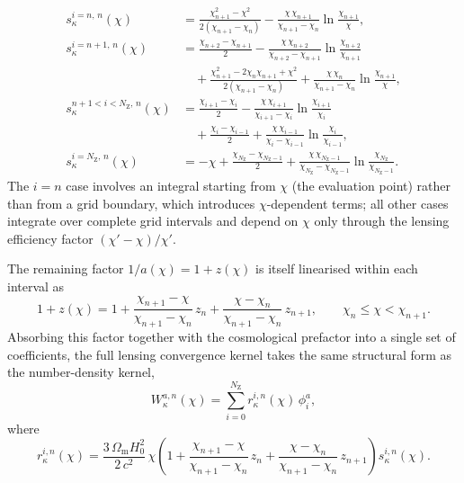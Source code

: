 \begin{align}
    s_\kappa^{i=n,\,n}(\chi) &= \frac{\chi_{n+1}^2 - \chi^2}{2(\chi_{n+1} - \chi_n)} - \frac{\chi\,\chi_{n+1}}{\chi_{n+1} - \chi_n}\ln\frac{\chi_{n+1}}{\chi}, \label{eq:4.9a} \\[6pt]
    s_\kappa^{i=n+1,\,n}(\chi) &= \frac{\chi_{n+2} - \chi_{n+1}}{2} - \frac{\chi\,\chi_{n+2}}{\chi_{n+2} - \chi_{n+1}}\ln\frac{\chi_{n+2}}{\chi_{n+1}} \nonumber\\
    &\quad + \frac{\chi_{n+1}^2 - 2\chi_n\chi_{n+1} + \chi^2}{2(\chi_{n+1} - \chi_n)} + \frac{\chi\,\chi_n}{\chi_{n+1} - \chi_n}\ln\frac{\chi_{n+1}}{\chi}, \label{eq:4.9b} \\[6pt]
    s_\kappa^{n+1<i<N_\mathrm{Z},\,n}(\chi) &= \frac{\chi_{i+1} - \chi_i}{2} - \frac{\chi\,\chi_{i+1}}{\chi_{i+1} - \chi_i}\ln\frac{\chi_{i+1}}{\chi_i} \nonumber\\
    &\quad + \frac{\chi_i - \chi_{i-1}}{2} + \frac{\chi\,\chi_{i-1}}{\chi_i - \chi_{i-1}}\ln\frac{\chi_i}{\chi_{i-1}}, \label{eq:4.9c} \\[6pt]
    s_\kappa^{i=N_\mathrm{Z},\,n}(\chi) &= -\chi + \frac{\chi_{N_\mathrm{Z}} - \chi_{N_\mathrm{Z}-1}}{2} + \frac{\chi\,\chi_{N_\mathrm{Z}-1}}{\chi_{N_\mathrm{Z}} - \chi_{N_\mathrm{Z}-1}}\ln\frac{\chi_{N_\mathrm{Z}}}{\chi_{N_\mathrm{Z}-1}}. \label{eq:4.9d}
\end{align}
The \(i = n\) case involves an integral starting from \(\chi\) (the evaluation point) rather than from a grid boundary, which introduces \(\chi\)-dependent terms; all other cases integrate over complete grid intervals and depend on \(\chi\) only through the lensing efficiency factor \((\chi' - \chi)/\chi'\).

The remaining factor \(1/a(\chi) = 1 + z(\chi)\) is itself linearised within each interval as
\begin{equation} \label{eq:4.10}
    1 + z(\chi) = 1 + \frac{\chi_{n+1} - \chi}{\chi_{n+1} - \chi_n}\,z_n + \frac{\chi - \chi_n}{\chi_{n+1} - \chi_n}\,z_{n+1}, \qquad \chi_n \le \chi < \chi_{n+1}.
\end{equation}
Absorbing this factor together with the cosmological prefactor into a single set of coefficients, the full lensing convergence kernel takes the same structural form as the number-density kernel,
\begin{equation} \label{eq:4.11}
    W_\kappa^{a,n}(\chi) = \sum_{i=0}^{N_\mathrm{Z}} r_\kappa^{i,n}(\chi)\,\phi^{a}_{i},
\end{equation}
where
\begin{equation} \label{eq:4.12}
    r_\kappa^{i,n}(\chi) = \frac{3\,\Omega_{\mathrm{m}} H_0^2}{2\,c^2}\,\chi\left(1 + \frac{\chi_{n+1} - \chi}{\chi_{n+1} - \chi_n}\,z_n + \frac{\chi - \chi_n}{\chi_{n+1} - \chi_n}\,z_{n+1}\right) s_\kappa^{i,n}(\chi).
\end{equation}

